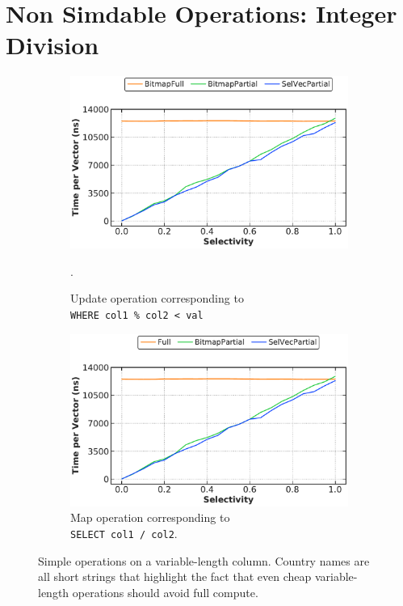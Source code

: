 \documentclass[12pt]{cmuthesis}
\begin{document}
\section{Non Simdable Operations: Integer Division}
\begin{figure}[t!]
\captionsetup[subfigure]{justification=justified}
\centering
\begin{subfigure}[t]{.49\linewidth}
 \centering
 \includegraphics[width=0.9\linewidth]{eval/simple_division_update.pdf}
 \caption{Update operation corresponding to \\ \texttt{\footnotesize WHERE col1 \% col2 < val}}.
  \label{fig:division_update}
\end{subfigure}
\begin{subfigure}[t]{.49\linewidth}
 \centering
 \includegraphics[width=0.9\linewidth]{eval/simple_division_map.pdf}
 \caption{Map operation corresponding to \\ \texttt{\footnotesize SELECT col1 / col2}.}
  \label{fig:division_map}
\end{subfigure}
\caption{Simple operations on a variable-length column. Country names are all short strings that highlight the fact that even cheap variable-length operations should avoid full compute.}
\label{fig:division_map_update}
\end{figure}
\end{document}
